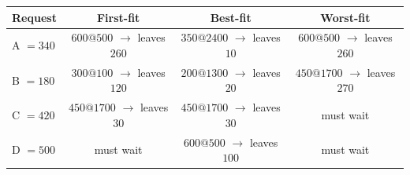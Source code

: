 \begin{tabular}{@{}lccc@{}}
\toprule
\textbf{Request} & \textbf{First-fit} & \textbf{Best-fit} & \textbf{Worst-fit}\\
\midrule
A $= 340$ & $600@500$ $\to$ leaves $260$ & $350@2400$ $\to$ leaves $10$ & $600@500$ $\to$ leaves $260$\\
B $= 180$ & $300@100$ $\to$ leaves $120$ & $200@1300$ $\to$ leaves $20$ & $450@1700$ $\to$ leaves $270$\\
C $= 420$ & $450@1700$ $\to$ leaves $30$ & $450@1700$ $\to$ leaves $30$ & \textcolor{red!60!black}{must wait}\\
D $= 500$ & \textcolor{red!60!black}{must wait} & $600@500$ $\to$ leaves $100$ & \textcolor{red!60!black}{must wait}\\
\bottomrule
\end{tabular}
